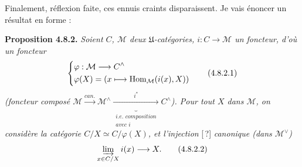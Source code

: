 Finalement, réflexion faite, ces ennuis craints disparaissent. Je vais énoncer un résultat en forme :

\textbf{Proposition 4.8.2.} \textit{Soient $C$, $\mathcal{M}$ deux $\mathfrak{U}$-catégories, $i : C \longrightarrow \mathcal{M}$ un foncteur, d'où un foncteur}
\[ \left\{\begin{aligned}
&\varphi : \mathcal{M} \longrightarrow C^{\wedge}\\
&\varphi(X) = (x \longmapsto \operatorname{Hom}_{\mathcal{M}}(i(x),X))
\end{aligned}\right. \tag*{(4.8.2.1)} \]
\textit{(foncteur composé $\mathcal{M} \xrightarrow{\textit{can.}} \mathcal{M}^{\wedge} \underbrace{\xrightarrow{i^*}}_{\substack{\textit{i.e. composition}\\ \textit{avec } i}} C^{\wedge}$). Pour tout $X$ dans $\mathcal{M}$, on considère la catégorie $C/X \simeq C/\varphi(X)$, et l'injection} [\,?] \textit{canonique (dans $\mathcal{M}^{\vee}$)}
\[ \varinjlim_{x\in C/X} i(x) \longrightarrow X . \tag*{(4.8.2.2)} \]
